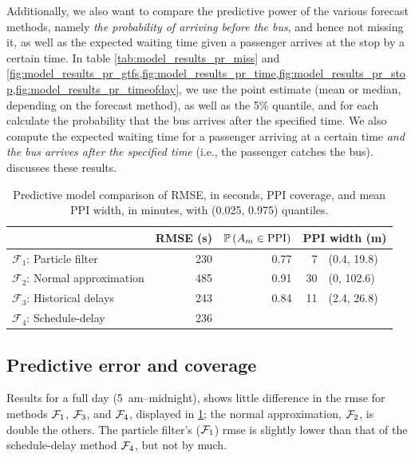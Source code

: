 Additionally, we also want to compare the predictive power of the various forecast methods, namely \emph{the probability of arriving before the bus}, and hence not missing it, as well as the expected waiting time given a passenger arrives at the stop by a certain time. In table \cref{tab:model_results_pr_miss} and \cref{fig:model_results_pr_gtfs,fig:model_results_pr_time,fig:model_results_pr_stop,fig:model_results_pr_timeofday}, we use the point estimate (mean or median, depending on the forecast method), as well as the 5\% quantile, and for each calculate the probability that the bus arrives after the specified time. We also compute the expected waiting time for a passenger arriving at a certain time \emph{and the bus arrives after the specified time} (i.e., the passenger catches the bus).  discusses these results.






\begin{knitrout}
\color{fgcolor}\begin{table}

\caption{\label{tab:model_results_rmse}Predictive model comparison of RMSE, in seconds, PPI coverage, and mean PPI width, in minutes, with (0.025, 0.975) quantiles.}
\centering
\begin{tabular}[t]{lrrrl}
\toprule
  & RMSE (s) & $\mathbb{P}\left(A_m \in \text{PPI}\right)$ & \multicolumn{2}{c}{PPI width (m)} \\
\midrule
$\mathcal{F}_1$: Particle filter & 230 & 0.77 & 7 & (0.4, 19.8)\\
$\mathcal{F}_2$: Normal approximation & 485 & 0.91 & 30 & (0, 102.6)\\
$\mathcal{F}_3$: Historical delays & 243 & 0.84 & 11 & (2.4, 26.8)\\
$\mathcal{F}_4$: Schedule-delay & 236 &  &  & \\
\bottomrule
\end{tabular}
\end{table}


\end{knitrout}




\subsection{Predictive error and coverage}
\label{sec:prediction_model_comp_stats}

Results for a full day (5~am--midnight), shows little difference in the \gls{rmse} for methods $\mathcal{F}_1$, $\mathcal{F}_3$, and $\mathcal{F}_4$, displayed in \cref{tab:model_results_rmse}; the normal approximation, $\mathcal{F}_2$, is double the others. The particle filter's ($\mathcal{F}_1$) \gls{rmse} is slightly lower than that of the schedule-delay method $\mathcal{F}_4$, but not by much.


